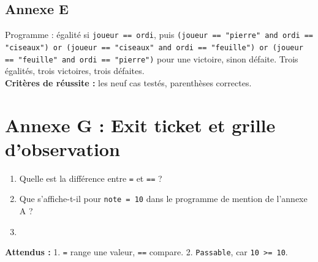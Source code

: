 \documentclass[11pt,a4paper]{article}
\begin{document}
\subsection*{Annexe E}
Programme : égalité si \texttt{joueur == ordi}, puis \texttt{(joueur == "pierre" and ordi == "ciseaux") or (joueur == "ciseaux" and ordi == "feuille") or (joueur == "feuille" and ordi == "pierre")} pour une victoire, sinon défaite. Trois égalités, trois victoires, trois défaites.\\
\textbf{Critères de réussite :} les neuf cas testés, parenthèses correctes.

\newpage
\section*{Annexe G : Exit ticket et grille d'observation}

\begin{enumerate}
 \item Quelle est la différence entre \texttt{=} et \texttt{==} ?\\ \lig
 \item Que s'affiche-t-il pour \texttt{note = 10} dans le programme de mention de l'annexe A ?\\ \lig
 \item \autoeval
\end{enumerate}
\textbf{Attendus :} 1. \texttt{=} range une valeur, \texttt{==} compare. 2. \texttt{Passable}, car \texttt{10 >= 10}.

\bigskip
{}
\end{document}
